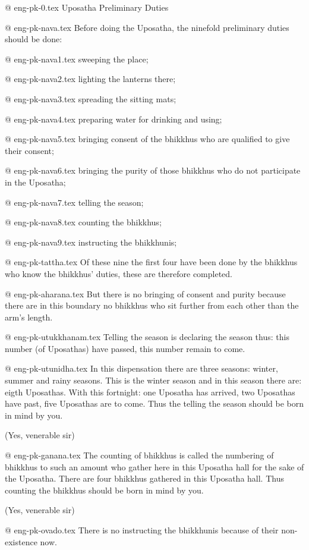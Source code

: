 @ eng-pk-0.tex
Uposatha Preliminary Duties

@ eng-pk-nava.tex
Before doing the Uposatha, the ninefold preliminary duties should be done:

@ eng-pk-nava1.tex
sweeping the place;

@ eng-pk-nava2.tex
lighting the lanterns there;

@ eng-pk-nava3.tex
spreading the sitting mats;

@ eng-pk-nava4.tex
preparing water for drinking and using;

@ eng-pk-nava5.tex
bringing consent of the bhikkhus who are qualified to give their consent;

@ eng-pk-nava6.tex
bringing the purity of those bhikkhus who do not participate in the Uposatha;

@ eng-pk-nava7.tex
telling the season;

@ eng-pk-nava8.tex
counting the bhikkhus;

@ eng-pk-nava9.tex
instructing the bhikkhunis;

@ eng-pk-tattha.tex
Of these nine the first four have been done by the bhikkhus who know the bhikkhus' duties, these are therefore completed.

@ eng-pk-aharana.tex
But there is no bringing of consent and purity because there are in this boundary no bhikkhus who sit further from each other than the arm's length.

@ eng-pk-utukkhanam.tex
Telling the season is declaring the season thus: this number (of Uposathas) have passed, this number remain to come.

@ eng-pk-utunidha.tex
In this dispensation there are three seasons: winter, summer and rainy seasons.  This is the winter season and in this season there are: eigth Uposathas.  With this fortnight: one Uposatha has arrived, two Uposathas have past, five Uposathas are to come.  Thus the telling the season should be born in mind by you.

(Yes, venerable sir)

@ eng-pk-ganana.tex
The counting of bhikkhus is called the numbering of bhikkhus to such an amount who gather here in this Uposatha hall for the sake of the Uposatha. There are four bhikkhus gathered in this Uposatha hall.  Thus counting the bhikkhus should be born in mind by you.

(Yes, venerable sir)

@ eng-pk-ovado.tex
There is no instructing the bhikkhunis because of their non-existence now.

